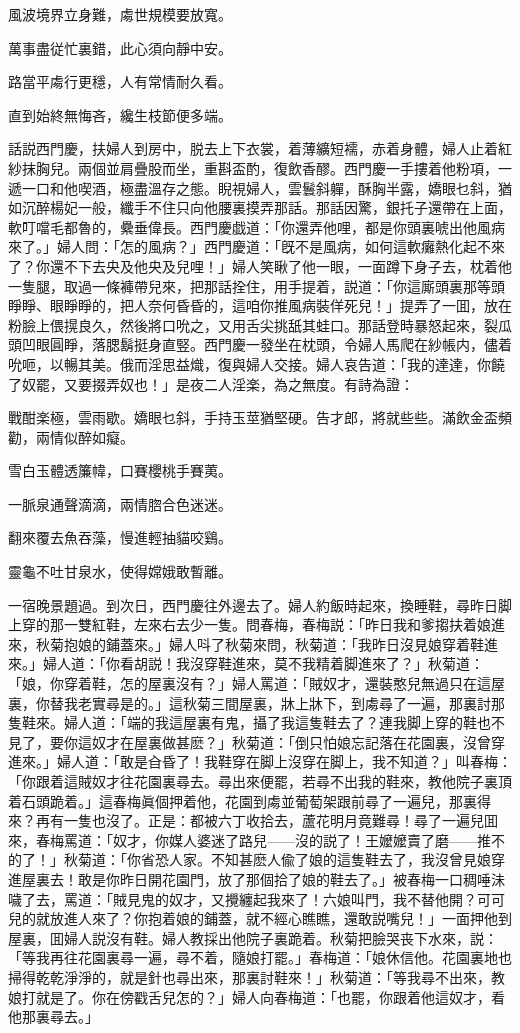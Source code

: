 風波境界立身難，䖏世規模要放寬。

萬事盡従忙裏錯，此心須向靜中安。

路當平䖏行更穩，人有常情耐久看。

直到始終無悔吝，纔生枝節便多端。

話説西門慶，扶婦人到房中，脱去上下衣裳，着薄纊短襦，赤着身體，婦人止着紅紗抹胸兒。兩個並肩疊股而坐，重斟盃酌，復飲香醪。西門慶一手摟着他粉項，一遞一口和他喫酒，極盡溫存之態。睨視婦人，雲鬟斜軃，酥胸半露，嬌眼乜斜，猶如沉醉楊妃一般，纖手不住只向他腰裏摸弄那話。那話因驚，銀托子還帶在上面，軟叮噹毛都魯的，纍垂偉長。西門慶戯道：「你還弄他哩，都是你頭裏唬出他風病來了。」婦人問：「怎的風病？」西門慶道：「旣不是風病，如何這軟癱熱化起不來了？你還不下去央及他央及兒哩！」婦人笑瞅了他一眼，一面蹲下身子去，枕着他一隻腿，取過一條褲帶兒來，把那話拴住，用手提着，説道：「你這廝頭裏那等頭睜睜、眼睜睜的，把人奈何昏昏的，這咱你推風病裝佯死兒！」提弄了一囬，放在粉臉上偎㨪良久，然後將口吮之，又用舌尖挑舐其蛙口。那話登時暴怒起來，裂瓜頭凹眼圓睜，落腮鬍挺身直竪。西門慶一發坐在枕頭，令婦人馬爬在紗帳内，儘着吮咂，以暢其美。俄而淫思益熾，復與婦人交接。婦人哀告道：「我的達達，你饒了奴罷，又要掇弄奴也！」是夜二人淫楽，為之無度。有詩為證：

戰酣楽極，雲雨歇。嬌眼乜斜，手持玉莖猶堅硬。告才郎，將就些些。滿飲金盃頻勸，兩情似醉如癡。

雪白玉體透簾幃，口賽櫻桃手賽荑。

一脈泉通聲滴滴，兩情脗合色迷迷。

翻來覆去魚吞藻，慢進輕抽貓咬鷄。

靈龜不吐甘泉水，使得嫦娥敢暫離。

一宿晚景題過。到次日，西門慶往外邊去了。婦人約飯時起來，換睡鞋，尋昨日脚上穿的那一雙紅鞋，左來右去少一隻。問春梅，春梅説：「昨日我和爹搊扶着娘進來，秋菊抱娘的鋪蓋來。」婦人呌了秋菊來問，秋菊道：「我昨日沒見娘穿着鞋進來。」婦人道：「你看胡説！我沒穿鞋進來，莫不我精着脚進來了？」秋菊道：「娘，你穿着鞋，怎的屋裏沒有？」婦人罵道：「賊奴才，還裝憨兒無過只在這屋裏，你替我老實尋是的。」這秋菊三間屋裏，牀上牀下，到䖏尋了一遍，那裏討那隻鞋來。婦人道：「端的我這屋裏有鬼，攝了我這隻鞋去了？連我脚上穿的鞋也不見了，要你這奴才在屋裏做甚麽？」秋菊道：「倒只怕娘忘記落在花園裏，沒曾穿進來。」婦人道：「敢是㒲昏了！我鞋穿在脚上沒穿在脚上，我不知道？」叫春梅：「你跟着這賊奴才往花園裏尋去。尋出來便罷，若尋不出我的鞋來，教他院子裏頂着石頭跪着。」這春梅眞個押着他，花園到䖏並葡萄架跟前尋了一遍兒，那裏得來？再有一隻也沒了。正是：都被六丁收拾去，蘆花明月竟難尋！尋了一遍兒囬來，春梅罵道：「奴才，你媒人婆迷了路兒——沒的説了！王嬤嬤賣了磨——推不的了！」秋菊道：「你省恐人家。不知甚麽人偸了娘的這隻鞋去了，我沒曾見娘穿進屋裏去！敢是你昨日開花園門，放了那個拾了娘的鞋去了。」被春梅一口稠唾沬噦了去，罵道：「賊見鬼的奴才，又攪纏起我來了！六娘叫門，我不替他開？可可兒的就放進人來了？你抱着娘的鋪蓋，就不經心瞧瞧，還敢説嘴兒！」一面押他到屋裏，囬婦人説沒有鞋。婦人教採出他院子裏跪着。秋菊把臉哭丧下水來，説：「等我再往花園裏尋一遍，尋不着，隨娘打罷。」春梅道：「娘休信他。花園裏地也掃得乾乾淨淨的，就是針也尋出來，那裏討鞋來！」秋菊道：「等我尋不出來，教娘打就是了。你在傍戳舌兒怎的？」婦人向春梅道：「也罷，你跟着他這奴才，看他那裏尋去。」

